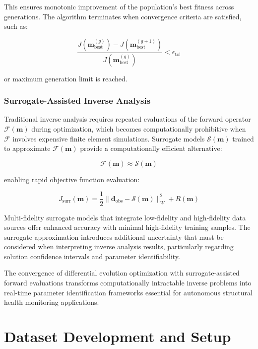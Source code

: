 \documentclass[12pt,a4paper]{report}
\begin{document}
This ensures monotonic improvement of the population's best fitness across generations. The algorithm terminates when convergence criteria are satisfied, such as:

\begin{equation}
\frac{J(\mathbf{m}_{\text{best}}^{(g)}) - J(\mathbf{m}_{\text{best}}^{(g+1)})}{J(\mathbf{m}_{\text{best}}^{(g)})} < \epsilon_{\text{tol}}
\end{equation}

or maximum generation limit is reached.

\subsection{Surrogate-Assisted Inverse Analysis}

Traditional inverse analysis requires repeated evaluations of the forward operator $\mathcal{F}(\mathbf{m})$ during optimization, which becomes computationally prohibitive when $\mathcal{F}$ involves expensive finite element simulations. Surrogate models $\mathcal{S}(\mathbf{m})$ trained to approximate $\mathcal{F}(\mathbf{m})$ provide a computationally efficient alternative:

\begin{equation}
\mathcal{F}(\mathbf{m}) \approx \mathcal{S}(\mathbf{m})
\end{equation}

enabling rapid objective function evaluation:

\begin{equation}
J_{\text{surr}}(\mathbf{m}) = \frac{1}{2}\|\mathbf{d}_{\text{obs}} - \mathcal{S}(\mathbf{m})\|_W^2 + R(\mathbf{m})
\end{equation}

Multi-fidelity surrogate models that integrate low-fidelity and high-fidelity data sources offer enhanced accuracy with minimal high-fidelity training samples. The surrogate approximation introduces additional uncertainty that must be considered when interpreting inverse analysis results, particularly regarding solution confidence intervals and parameter identifiability.

The convergence of differential evolution optimization with surrogate-assisted forward evaluations transforms computationally intractable inverse problems into real-time parameter identification frameworks essential for autonomous structural health monitoring applications.


\chapter{Dataset Development and Setup}
\end{document}
